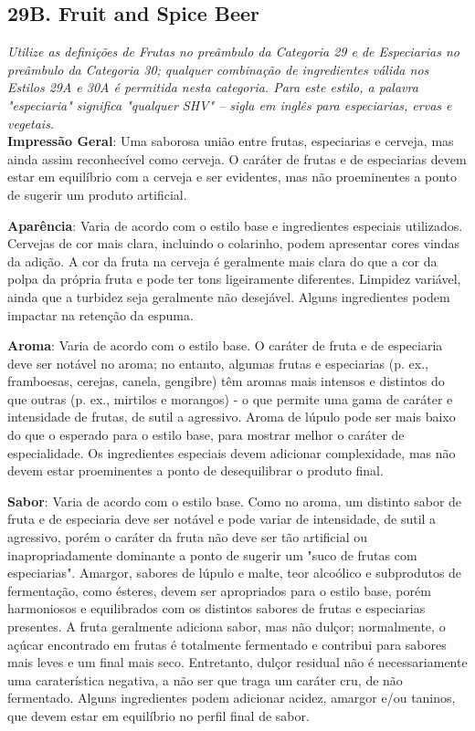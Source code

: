 \subsection*{29B. Fruit and Spice Beer}
\textit{Utilize as definições de Frutas no preâmbulo da Categoria 29 e de Especiarias no preâmbulo da Categoria 30; qualquer combinação de ingredientes válida nos Estilos 29A e 30A é permitida nesta categoria. Para este estilo, a palavra "especiaria" significa "qualquer SHV" – sigla em inglês para especiarias, ervas e vegetais.}\\
\textbf{Impressão Geral}: Uma saborosa união entre frutas, especiarias e cerveja, mas ainda assim reconhecível como cerveja. O caráter de frutas e de especiarias devem estar em equilíbrio com a cerveja e ser evidentes, mas não proeminentes a ponto de sugerir um produto artificial.

\textbf{Aparência}: Varia de acordo com o estilo base e ingredientes especiais utilizados. Cervejas de cor mais clara, incluindo o colarinho, podem apresentar cores vindas da adição. A cor da fruta na cerveja é geralmente mais clara do que a cor da polpa da própria fruta e pode ter tons ligeiramente diferentes. Limpidez variável, ainda que a turbidez seja geralmente não desejável. Alguns ingredientes podem impactar na retenção da espuma.

\textbf{Aroma}: Varia de acordo com o estilo base. O caráter de fruta e de especiaria deve ser notável no aroma; no entanto, algumas frutas e especiarias (p. ex., framboesas, cerejas, canela, gengibre) têm aromas mais intensos e distintos do que outras (p. ex., mirtilos e morangos) - o que permite uma gama de caráter e intensidade de frutas, de sutil a agressivo. Aroma de lúpulo pode ser mais baixo do que o esperado para o estilo base, para mostrar melhor o caráter de especialidade. Os ingredientes especiais devem adicionar complexidade, mas não devem estar proeminentes a ponto de desequilibrar o produto final.

\textbf{Sabor}: Varia de acordo com o estilo base. Como no aroma, um distinto sabor de fruta e de especiaria deve ser notável e pode variar de intensidade, de sutil a agressivo, porém o caráter da fruta não deve ser tão artificial ou inapropriadamente dominante a ponto de sugerir um "suco de frutas com especiarias". Amargor, sabores de lúpulo e malte, teor alcoólico e subprodutos de fermentação, como ésteres, devem ser apropriados para o estilo base, porém harmoniosos e equilibrados com os distintos sabores de frutas e especiarias presentes. A fruta geralmente adiciona sabor, mas não dulçor; normalmente, o açúcar encontrado em frutas é totalmente fermentado e contribui para sabores mais leves e um final mais seco. Entretanto, dulçor residual não é necessariamente uma caraterística negativa, a não ser que traga um caráter cru, de não fermentado. Alguns ingredientes podem adicionar acidez, amargor e/ou taninos, que devem estar em equilíbrio no perfil final de sabor.

